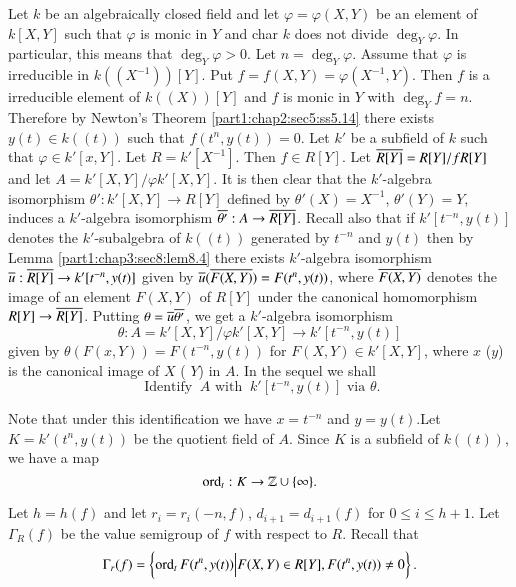 \begin{notn}\label{part1:chap4:sec11:notn11.13}
  Let $k$ be an algebraically closed field and let $\varphi =
  \varphi(X, Y)$ be an element of $k[X, Y]$ such that $\varphi$ is
  monic in $Y$ and char $k$ does not divide $\deg_{Y} \varphi$. In
  particular, this means that $\deg_{Y}\varphi> 0$. Let $n = \deg_Y
  \varphi$. Assume that $\varphi$ is irreducible in $k((X^{-1}))
  [Y]$. Put $f=f(X, Y)= \varphi(X^{-1}, Y)$. Then $f$ is a
  irreducible element of $k((X)) [Y]$ and $f$ is monic in $Y$
  with $\deg_Y f=n$. Therefore by Newton's Theorem
  \ref{part1:chap2:sec5:ss5.14} there exists $y(t) \in k ((t))$
  such that $f(t^n, y(t))=0$. Let $k'$ be a subfield of $k$
  such that $\varphi \in k' [x, Y]$. Let $R= k' [X^{-1}]$. Then
  $f \in R[Y]$. Let $\overline{R[Y]}= R[Y]/f R[Y]$ and let $A = k'
  [X, Y]/\varphi k' [X, Y]$. It is then clear that the
  $k'$-algebra isomorphism $\theta': k' [X, Y]\to R[Y]$ defined
  by $\theta' (X) = X^{-1}$, $\theta' (Y) = Y$, induces a
  $k'$-algebra isomorphism $\overline{\theta'} : A \to
  \overline{R[Y]}$. Recall also that if $k' [t^{-n} , y(t)]$ denotes
  the $k'$-subalgebra of $k((t))$ generated by\pageoriginale
  $t^{-n}$ and $y(t)$ then by Lemma \ref{part1:chap3:sec8:lem8.4}
  there exists $k'$-algebra isomorphism $\overline{u} : \overline{R[Y]} \to k'
  [t^{-n}, y(t)]$ given by $\overline{u} (\overline{F(X, Y)})= F(t^n, y(t))$,
  where $\overline{F(X, Y)}$ denotes the image of an element $F(X, Y)$ of
  $R[Y]$ under the canonical homomorphism $R[Y] \to
  \overline{R[Y]}$. Putting $\theta = \overline{u} \overline{\theta'}$, we get a
  $k'$-algebra isomorphism
  $$
  \theta : A = k' [X, Y]/ \varphi k' [X, Y] \to k'[t^{-n}, y(t)]
  $$
  given by $\theta(F(x, Y))= F(t^{-n}, y(t))$ for $F(X, Y) \in k' [X,
    Y]$, where $x$ (\resp\break $y$) is the canonical image of $X$ (\resp
  $Y$) in $A$. In the sequel we shall 
  \begin{equation*}
   \text{ Identify } ~ A \text{ with } ~ k' [t^{-n} , y(t)] \text{ via }
    \theta. \tag{11.13.1}\label{part1:chap4:sec11:eq11.13.1} 
  \end{equation*}
\end{notn}

Note that under this identification we have $x= t^{-n}$ and $y=
y(t)$.\break Let $K= k' (t^n, y(t))$ be the quotient field of $A$. Since $K$
is a subfield of $k((t))$, we have a map
$$
\operatorname{ord}_t: K \to \mathbb{Z} \cup \{ \infty\}.
$$

Let $h= h(f)$ and let $r_i = r_i (-n, f)$, $d_{i+1}= d_{i+1}(f)$ for
$0 \leq i \leq h+1$. Let $\Gamma_R(f)$ be the value semigroup of $f$
with respect to $R$. Recall that
$$
\Gamma_r (f) = \left\{ \operatorname{ord}_t F(t^n, y(t))\Big| F(X, Y) \in R [Y],
F(t^n, y(t))\neq 0 \right\}.
$$

